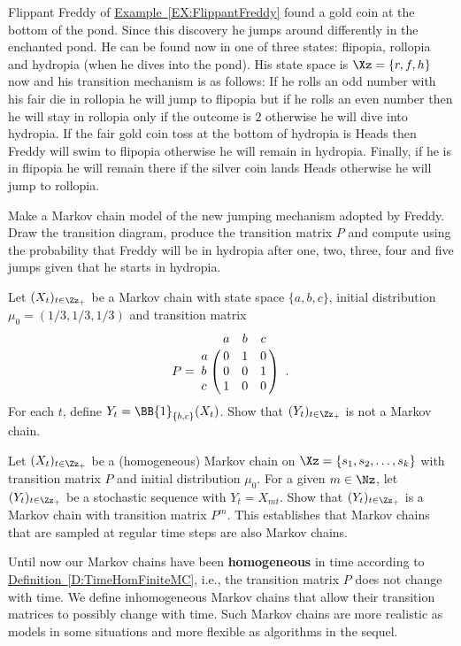 \begin{exercise}\label{EXR:FreddyGoldCoin}
Flippant Freddy of \hyperref[EX:FlippantFreddy]{Example~\ref*{EX:FlippantFreddy}} found a gold coin at the bottom of the pond.  Since this discovery he  jumps around differently in the enchanted pond.  He can be found now in one of three states: flipopia, rollopia and hydropia (when he dives into the pond). His state space is $\Xz=\{r,f,h\}$ now and his transition mechanism is as follows: If he rolls an odd number with his fair die in rollopia he will jump to flipopia but if he rolls an even number then he will stay in rollopia only if the outcome is $2$ otherwise he will dive into hydropia.  If the fair gold coin toss at the bottom of hydropia is Heads then Freddy will swim to flipopia otherwise he will remain in hydropia. Finally, if he is in flipopia he will remain there if the silver coin lands Heads otherwise he will jump to rollopia.

Make a Markov chain model of the new jumping mechanism adopted by Freddy.  Draw the transition diagram, produce the transition matrix $P$ and compute using \Matlab the probability that Freddy will be in hydropia after one, two, three, four and five jumps given that he starts in hydropia.
\end{exercise}

\begin{exercise}\label{Exr:NonMarkovProjection1}
Let $(X_t)_{t\in\Zz_+}$ be a Markov chain with state space $\{a,b,c\}$, initial distribution $\mu_0=(1/3,1/3,1/3)$ and transition matrix 
$$P = 
\bordermatrix{~ & a & b & c \cr
a & 0 & 1 & 0\cr
b & 0 & 0 & 1\cr
c & 1 & 0 & 0} \enspace .
$$
For each $t$, define $Y_t = \BB{1}_{\{b,c\}}(X_t)$.  Show that $(Y_t)_{t\in\Zz_+}$ is not a Markov chain.
\end{exercise}

\begin{exercise}\label{Exr:RegularSampledChainIsMarkov}
Let $(X_t)_{t\in\Zz_+}$ be a (homogeneous) Markov chain on $\Xz=\{s_1,s_2,\ldots,s_k\}$ with transition matrix $P$ and initial distribution $\mu_0$.  For a given $m \in \Nz$, let $(Y_t)_{t\in\Zz_+}$ be a stochastic sequence with $Y_t = X_{mt}$.  Show that $(Y_t)_{t\in\Zz_+}$ is a Markov chain with transition matrix $P^m$.  This establishes that Markov chains that are sampled at regular time steps are also Markov chains.
\end{exercise}


Until now our Markov chains have been {\bf  homogeneous} in time according to \hyperref[D:TimeHomFiniteMC]{Definition~\ref*{D:TimeHomFiniteMC}}, i.e., the transition matrix $P$ does not change with time.  We define inhomogeneous Markov chains that allow their transition matrices to possibly change with time.  Such Markov chains are more realistic as models in some situations and more flexible as algorithms in the sequel.

